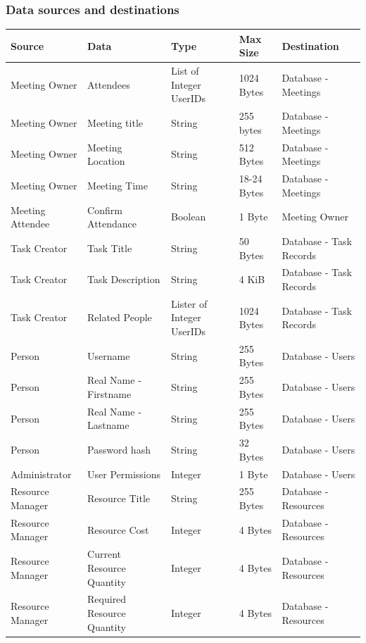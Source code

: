 \subsubsection{Data sources and destinations}

\begin{table}[]
\centering
\label{my-label}
\begin{tabular}{|l|l|l|l|l|}
\hline
Source & Data & Type & Max Size & Destination \\ \hline
Meeting Owner & Attendees & List of Integer UserIDs & 1024 Bytes & Database - Meetings \\ \hline
Meeting Owner & Meeting title & String & 255 bytes & Database - Meetings \\ \hline
Meeting Owner & Meeting Location & String & 512 Bytes & Database - Meetings \\ \hline
Meeting Owner & Meeting Time & String & 18-24 Bytes & Database - Meetings \\ \hline
Meeting Attendee & Confirm Attendance & Boolean & 1 Byte & Meeting Owner \\ \hline
Task Creator & Task Title & String & 50 Bytes & Database - Task Records \\ \hline
Task Creator & Task Description & String & 4 KiB & Database - Task Records \\ \hline
Task Creator & Related People & Lister of Integer UserIDs & 1024 Bytes & Database - Task Records \\ \hline
Person & Username & String & 255 Bytes & Database - Users \\ \hline
Person & Real Name - Firstname & String & 255 Bytes & Database - Users \\ \hline
Person & Real Name - Lastname & String & 255 Bytes & Database - Users \\ \hline
Person & Password hash & String & 32 Bytes & Database - Users \\ \hline
Administrator & User Permissions & Integer & 1 Byte & Database - Users \\ \hline
Resource Manager & Resource Title & String & 255 Bytes & Database - Resources \\ \hline
Resource Manager & Resource Cost & Integer & 4 Bytes & Database - Resources \\ \hline
Resource Manager & Current Resource Quantity & Integer & 4 Bytes & Database - Resources \\ \hline
Resource Manager & Required Resource Quantity & Integer & 4  Bytes & Database - Resources \\ \hline

\end{tabular}
\end{table}
